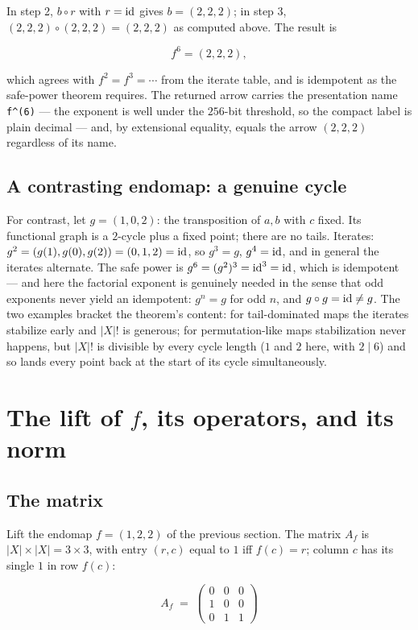 In step 2, $b \circ r$ with $r = \mathrm{id}$ gives $b = (2,2,2)$; in step 3,
$(2,2,2) \circ (2,2,2) = (2,2,2)$ as computed above. The result is

\[
f^{6} = (2, 2, 2),
\]

which agrees with $f^2 = f^3 = \cdots$ from the iterate table, and is
idempotent as the safe-power theorem requires. The returned arrow
carries the presentation name \texttt{f\^{}(6)} --- the exponent is
well under the $256$-bit threshold, so the compact label is plain
decimal --- and, by extensional equality, equals the arrow $(2,2,2)$
regardless of its name.

\subsection{A contrasting endomap: a genuine cycle}

For contrast, let $g = (1, 0, 2)$: the transposition of $a, b$ with
$c$ fixed. Its functional graph is a $2$-cycle plus a fixed point;
there are no tails. Iterates: $g^2 = (g(1), g(0), g(2)) = (0, 1, 2) =
\mathrm{id}$, so $g^3 = g$, $g^4 = \mathrm{id}$, and in general the iterates alternate.
The safe power is $g^{6} = (g^2)^3 = \mathrm{id}^3 = \mathrm{id}$, which is idempotent
--- and here the factorial exponent is genuinely needed in the sense
that odd exponents never yield an idempotent: $g^n = g$ for odd $n$,
and $g \circ g = \mathrm{id} \ne g$. The two examples bracket the theorem's
content: for tail-dominated maps the iterates stabilize early and
$|X|!$ is generous; for permutation-like maps stabilization never
happens, but $|X|!$ is divisible by every cycle length ($1$ and $2$
here, with $2 \mid 6$) and so lands every point back at the start of
its cycle simultaneously.

\section{The lift of $f$, its operators, and its norm}\label{appA:sec:lift}

\subsection{The matrix}

Lift the endomap $f = (1,2,2)$ of the previous section. The matrix
$A_f$ is $|X| \times |X| = 3 \times 3$, with entry $(r, c)$ equal to
$1$ iff $f(c) = r$; column $c$ has its single $1$ in row $f(c)$:

\[
A_f \;=\;
\begin{pmatrix}
0 & 0 & 0 \\
1 & 0 & 0 \\
0 & 1 & 1
\end{pmatrix}
\]

